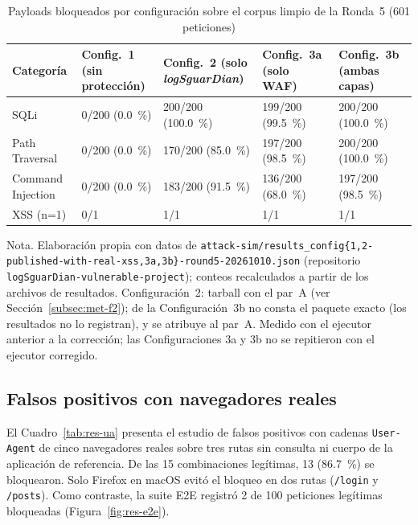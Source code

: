 \begin{table}[H]
\centering
\small
\begin{tabular}{|L{2.7cm}|L{2.0cm}|L{2.5cm}|L{2.5cm}|L{2.5cm}|}
\hline
\textbf{Categoría} & \textbf{Config.~1 (sin protección)} & \textbf{Config.~2 (solo \textit{logSguarDian})} & \textbf{Config.~3a (solo WAF)} & \textbf{Config.~3b (ambas capas)} \\ \hline
SQLi & 0/200 (0.0~\%) & 200/200 (100.0~\%) & 199/200 (99.5~\%) & 200/200 (100.0~\%) \\ \hline
Path Traversal & 0/200 (0.0~\%) & 170/200 (85.0~\%) & 197/200 (98.5~\%) & 200/200 (100.0~\%) \\ \hline
Command Injection & 0/200 (0.0~\%) & 183/200 (91.5~\%) & 136/200 (68.0~\%) & 197/200 (98.5~\%) \\ \hline
XSS (n=1) & 0/1 & 1/1 & 1/1 & 1/1 \\ \hline
\end{tabular}
\caption[Cuatro configuraciones sobre el corpus limpio de la Ronda 5]{Payloads bloqueados por configuración sobre el corpus limpio de la Ronda~5 (601 peticiones)}
\label{tab:res-ronda5}
\end{table}
{\footnotesize Nota. Elaboración propia con datos de
\texttt{attack-sim/results\_config\{1,2-published-with-real-xss,3a,3b\}-round5-20261010.json}
(repositorio \texttt{logSguarDian-vulnerable-project}); conteos recalculados a partir de los
archivos de resultados. Configuración~2: tarball con el par~A (ver Sección~\ref{subsec:met-f2}); de la Configuración~3b no consta el paquete exacto (los resultados no lo registran), y se atribuye al par~A. Medido con el ejecutor
anterior a la corrección; las Configuraciones 3a y 3b no se repitieron con el ejecutor corregido.}

\subsection{Falsos positivos con navegadores reales}

El Cuadro~\ref{tab:res-ua} presenta el estudio de falsos positivos con cadenas
\texttt{User-Agent} de cinco navegadores reales sobre tres rutas sin consulta ni cuerpo de la
aplicación de referencia. De las 15 combinaciones legítimas, 13 (86.7~\%) se bloquearon. Solo
Firefox en macOS evitó el bloqueo en dos rutas (\texttt{/login} y \texttt{/posts}). Como contraste,
la suite E2E registró 2 de 100 peticiones legítimas bloqueadas (Figura~\ref{fig:res-e2e}).

